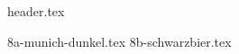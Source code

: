 \clearpage
{}
\divisorLine
{header.tex}
\begin{multicols}{2}
{8a-munich-dunkel.tex}
{8b-schwarzbier.tex}
\end{multicols}